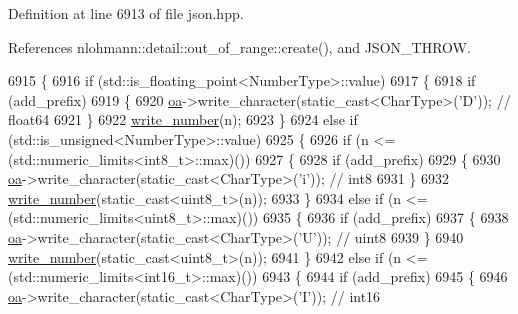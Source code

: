 Definition at line 6913 of file json.\+hpp.



References nlohmann\+::detail\+::out\+\_\+of\+\_\+range\+::create(), and J\+S\+O\+N\+\_\+\+T\+H\+R\+OW.


\begin{DoxyCode}
6915     \{
6916         \textcolor{keywordflow}{if} (std::is\_floating\_point<NumberType>::value)
6917         \{
6918             \textcolor{keywordflow}{if} (add\_prefix)
6919             \{
6920                 \hyperlink{classnlohmann_1_1detail_1_1binary__writer_a6f15b782a7900f50ef37d123008e601b}{oa}->write\_character(static\_cast<CharType>(\textcolor{charliteral}{'D'}));  \textcolor{comment}{// float64}
6921             \}
6922             \hyperlink{classnlohmann_1_1detail_1_1binary__writer_a62cfd50a511371e718f37ad7bb29ae9d}{write\_number}(n);
6923         \}
6924         \textcolor{keywordflow}{else} \textcolor{keywordflow}{if} (std::is\_unsigned<NumberType>::value)
6925         \{
6926             \textcolor{keywordflow}{if} (n <= (std::numeric\_limits<int8\_t>::max)())
6927             \{
6928                 \textcolor{keywordflow}{if} (add\_prefix)
6929                 \{
6930                     \hyperlink{classnlohmann_1_1detail_1_1binary__writer_a6f15b782a7900f50ef37d123008e601b}{oa}->write\_character(static\_cast<CharType>(\textcolor{charliteral}{'i'}));  \textcolor{comment}{// int8}
6931                 \}
6932                 \hyperlink{classnlohmann_1_1detail_1_1binary__writer_a62cfd50a511371e718f37ad7bb29ae9d}{write\_number}(static\_cast<uint8\_t>(n));
6933             \}
6934             \textcolor{keywordflow}{else} \textcolor{keywordflow}{if} (n <= (std::numeric\_limits<uint8\_t>::max)())
6935             \{
6936                 \textcolor{keywordflow}{if} (add\_prefix)
6937                 \{
6938                     \hyperlink{classnlohmann_1_1detail_1_1binary__writer_a6f15b782a7900f50ef37d123008e601b}{oa}->write\_character(static\_cast<CharType>(\textcolor{charliteral}{'U'}));  \textcolor{comment}{// uint8}
6939                 \}
6940                 \hyperlink{classnlohmann_1_1detail_1_1binary__writer_a62cfd50a511371e718f37ad7bb29ae9d}{write\_number}(static\_cast<uint8\_t>(n));
6941             \}
6942             \textcolor{keywordflow}{else} \textcolor{keywordflow}{if} (n <= (std::numeric\_limits<int16\_t>::max)())
6943             \{
6944                 \textcolor{keywordflow}{if} (add\_prefix)
6945                 \{
6946                     \hyperlink{classnlohmann_1_1detail_1_1binary__writer_a6f15b782a7900f50ef37d123008e601b}{oa}->write\_character(static\_cast<CharType>(\textcolor{charliteral}{'I'}));  \textcolor{comment}{// int16}

\end{DoxyCode}
